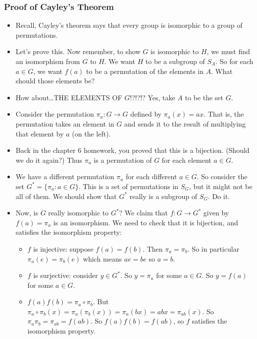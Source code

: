 \documentclass[12pt]{article}
\theoremstyle{plain}
\theoremstyle{definition}
\theoremstyle{remark}
\begin{document}
 \subsubsection*{Proof of Cayley's Theorem}
 \begin{itemize}
   \item Recall, Cayley's theorem says that every group is isomorphic to a group of permutations. 
   \item Let's prove this.  Now remember, to show $G$ is isomorphic to $H$, we must find an isomorphism from $G$ to $H$.  We want $H$ to be a subgroup of $S_A$.  So for each $a \in G$, we want $f(a)$ to be a permutation of the elements in $A$.  What should those elements be?
   \item How about\ldots THE ELEMENTS OF $G$!?!?!?  Yes, take $A$ to be the set $G$.
   \item Consider the permutation $\pi_a:G \to G$ defined by $\pi_a(x) = ax$.  That is, the permutation takes an element in $G$ and sends it to the result of multiplying that element by $a$ (on the left).
   \item Back in the chapter 6 homework, you proved that this is a bijection.  (Should we do it again?)  Thus $\pi_a$ is a permutation of $G$ for each element $a \in G$.
   \item We have a different permutation $\pi_a$ for each different $a \in G$.  So consider the set $G^* = \{\pi_a : a \in G\}$.  This is a set of permutations in $S_G$, but it might not be all of them.  We should show that $G^*$ really is a subgroup of $S_G$.  Do it.
   \item Now, is $G$ really isomorphic to $G^*$?  We claim that $f:G \to G^*$ given by $f(a) = \pi_a$ is an isomorphism.  We need to check that it is bijection, and satisfies the isomorphism property:
   \begin{itemize}
     \item $f$ is injective: suppose $f(a) = f(b)$.  Then $\pi_a = \pi_b$.  So in particular $\pi_a(e) = \pi_b(e)$ which means $ae = be$ so $a = b$.  
     \item $f$ is surjective: consider $y \in G^*$.  So $y = \pi_a$ for some $a \in G$.  So $y = f(a)$ for some $a \in G$.
     \item $f(a)f(b) = \pi_a \circ \pi_b$. But $\pi_a\circ \pi_b(x) = \pi_a(\pi_b(x)) = \pi_a(bx) = abx = \pi_{ab}(x)$.  So $\pi_a\pi_b = \pi_{ab} = f(ab)$.  So $f(a)f(b) = f(ab)$, so $f$ satisfies the isomorphism property.
   \end{itemize}
 \end{itemize}
\end{document}

